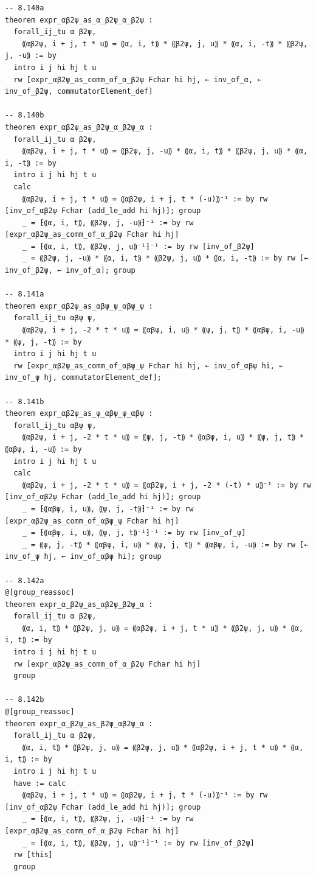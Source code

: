 \documentclass[10pt,a4paper]{article}
\begin{document}
\begin{Verbatim}
-- 8.140a
theorem expr_αβ2ψ_as_α_β2ψ_α_β2ψ :
  forall_ij_tu α β2ψ,
    ⸨αβ2ψ, i + j, t * u⸩ = ⸨α, i, t⸩ * ⸨β2ψ, j, u⸩ * ⸨α, i, -t⸩ * ⸨β2ψ, j, -u⸩ := by
  intro i j hi hj t u
  rw [expr_αβ2ψ_as_comm_of_α_β2ψ Fchar hi hj, ← inv_of_α, ← inv_of_β2ψ, commutatorElement_def]

-- 8.140b
theorem expr_αβ2ψ_as_β2ψ_α_β2ψ_α :
  forall_ij_tu α β2ψ,
    ⸨αβ2ψ, i + j, t * u⸩ = ⸨β2ψ, j, -u⸩ * ⸨α, i, t⸩ * ⸨β2ψ, j, u⸩ * ⸨α, i, -t⸩ := by
  intro i j hi hj t u
  calc
    ⸨αβ2ψ, i + j, t * u⸩ = ⸨αβ2ψ, i + j, t * (-u)⸩⁻¹ := by rw [inv_of_αβ2ψ Fchar (add_le_add hi hj)]; group
    _ = ⁅⸨α, i, t⸩, ⸨β2ψ, j, -u⸩⁆⁻¹ := by rw [expr_αβ2ψ_as_comm_of_α_β2ψ Fchar hi hj]
    _ = ⁅⸨α, i, t⸩, ⸨β2ψ, j, u⸩⁻¹⁆⁻¹ := by rw [inv_of_β2ψ]
    _ = ⸨β2ψ, j, -u⸩ * ⸨α, i, t⸩ * ⸨β2ψ, j, u⸩ * ⸨α, i, -t⸩ := by rw [← inv_of_β2ψ, ← inv_of_α]; group

-- 8.141a
theorem expr_αβ2ψ_as_αβψ_ψ_αβψ_ψ :
  forall_ij_tu αβψ ψ,
    ⸨αβ2ψ, i + j, -2 * t * u⸩ = ⸨αβψ, i, u⸩ * ⸨ψ, j, t⸩ * ⸨αβψ, i, -u⸩ * ⸨ψ, j, -t⸩ := by
  intro i j hi hj t u
  rw [expr_αβ2ψ_as_comm_of_αβψ_ψ Fchar hi hj, ← inv_of_αβψ hi, ← inv_of_ψ hj, commutatorElement_def];

-- 8.141b
theorem expr_αβ2ψ_as_ψ_αβψ_ψ_αβψ :
  forall_ij_tu αβψ ψ,
    ⸨αβ2ψ, i + j, -2 * t * u⸩ = ⸨ψ, j, -t⸩ * ⸨αβψ, i, u⸩ * ⸨ψ, j, t⸩ * ⸨αβψ, i, -u⸩ := by
  intro i j hi hj t u
  calc
    ⸨αβ2ψ, i + j, -2 * t * u⸩ = ⸨αβ2ψ, i + j, -2 * (-t) * u⸩⁻¹ := by rw [inv_of_αβ2ψ Fchar (add_le_add hi hj)]; group
    _ = ⁅⸨αβψ, i, u⸩, ⸨ψ, j, -t⸩⁆⁻¹ := by rw [expr_αβ2ψ_as_comm_of_αβψ_ψ Fchar hi hj]
    _ = ⁅⸨αβψ, i, u⸩, ⸨ψ, j, t⸩⁻¹⁆⁻¹ := by rw [inv_of_ψ]
    _ = ⸨ψ, j, -t⸩ * ⸨αβψ, i, u⸩ * ⸨ψ, j, t⸩ * ⸨αβψ, i, -u⸩ := by rw [← inv_of_ψ hj, ← inv_of_αβψ hi]; group

-- 8.142a
@[group_reassoc]
theorem expr_α_β2ψ_as_αβ2ψ_β2ψ_α :
  forall_ij_tu α β2ψ,
    ⸨α, i, t⸩ * ⸨β2ψ, j, u⸩ = ⸨αβ2ψ, i + j, t * u⸩ * ⸨β2ψ, j, u⸩ * ⸨α, i, t⸩ := by
  intro i j hi hj t u
  rw [expr_αβ2ψ_as_comm_of_α_β2ψ Fchar hi hj]
  group

-- 8.142b
@[group_reassoc]
theorem expr_α_β2ψ_as_β2ψ_αβ2ψ_α :
  forall_ij_tu α β2ψ,
    ⸨α, i, t⸩ * ⸨β2ψ, j, u⸩ = ⸨β2ψ, j, u⸩ * ⸨αβ2ψ, i + j, t * u⸩ * ⸨α, i, t⸩ := by
  intro i j hi hj t u
  have := calc
    ⸨αβ2ψ, i + j, t * u⸩ = ⸨αβ2ψ, i + j, t * (-u)⸩⁻¹ := by rw [inv_of_αβ2ψ Fchar (add_le_add hi hj)]; group
    _ = ⁅⸨α, i, t⸩, ⸨β2ψ, j, -u⸩⁆⁻¹ := by rw [expr_αβ2ψ_as_comm_of_α_β2ψ Fchar hi hj]
    _ = ⁅⸨α, i, t⸩, ⸨β2ψ, j, u⸩⁻¹⁆⁻¹ := by rw [inv_of_β2ψ]
  rw [this]
  group


\end{Verbatim}
\end{document}
